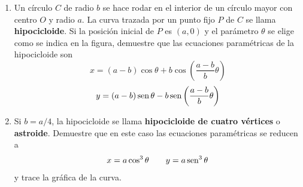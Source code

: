 \item 
    \begin{enumerate}
        \item[(a)] Un círculo $C$ de radio $b$ se hace rodar en el interior de un círculo mayor con centro $O$ y radio $a$. La curva trazada por un punto fijo $P$ de $C$ se llama \textbf{hipocicloide}. Si la posición inicial de $P$ es $(a, 0)$ y el parámetro $\theta$ se elige como se indica en la figura, demuestre que las ecuaciones paramétricas de la hipocicloide son
        \[ x = (a - b) \cos \theta + b \cos\left(\frac{a - b}{b}\theta\right) \]
        \[ y = (a - b) \operatorname{sen} \theta - b \operatorname{sen}\left(\frac{a - b}{b}\theta\right) \]
        
        \begin{center}
        \end{center}

        \item[(b)] Si $b = a/4$, la hipocicloide se llama \textbf{hipocicloide de cuatro vértices} o \textbf{astroide}. Demuestre que en este caso las ecuaciones paramétricas se reducen a
        \[ x = a \cos^3 \theta \qquad y = a \operatorname{sen}^3 \theta \]
        y trace la gráfica de la curva.
    \end{enumerate}
